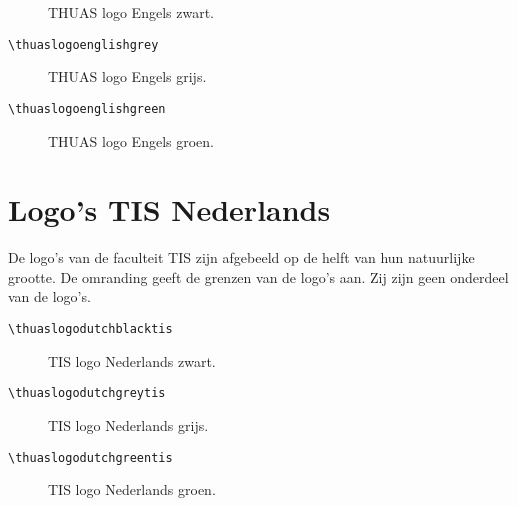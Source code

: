 \documentclass[a4paper,12pt]{article}
\begin{document}
\begin{figure}[H]
\centering\fboxsep=0pt%
\fbox{%
\thuaslogoenglishblack}
\caption{THUAS logo Engels zwart.}
\end{figure}

\begin{verbatim}
\thuaslogoenglishgrey
\end{verbatim}

\begin{figure}[H]
\centering\fboxsep=0pt%
\fbox{%
\thuaslogoenglishgrey}
\caption{THUAS logo Engels grijs.}
\end{figure}

\begin{verbatim}
\thuaslogoenglishgreen
\end{verbatim}

\begin{figure}[H]
\centering\fboxsep=0pt%
\fbox{%
\thuaslogoenglishgreen}
\caption{THUAS logo Engels groen.}
\end{figure}


\section{Logo's TIS Nederlands}
De logo's van de faculteit TIS zijn afgebeeld op de helft van hun natuurlijke grootte.
De omranding geeft de grenzen van de logo's aan. Zij zijn geen onderdeel
van de logo's.

\begin{verbatim}
\thuaslogodutchblacktis
\end{verbatim}

\begin{figure}[H]
\centering\fboxsep=0pt%
\fbox{%
\scalebox{0.7071}{\thuaslogodutchblacktis}}
\caption{TIS logo Nederlands zwart.}
\end{figure}

\begin{verbatim}
\thuaslogodutchgreytis
\end{verbatim}

\begin{figure}[H]
\centering\fboxsep=0pt%
\fbox{%
\scalebox{0.7071}{\thuaslogodutchgreytis}}
\caption{TIS logo Nederlands grijs.}
\end{figure}

\begin{verbatim}
\thuaslogodutchgreentis
\end{verbatim}

\begin{figure}[H]
\centering\fboxsep=0pt%
\fbox{%
\scalebox{0.7071}{\thuaslogodutchgreentis}}
\caption{TIS logo Nederlands groen.}
\end{figure}
\end{document}
